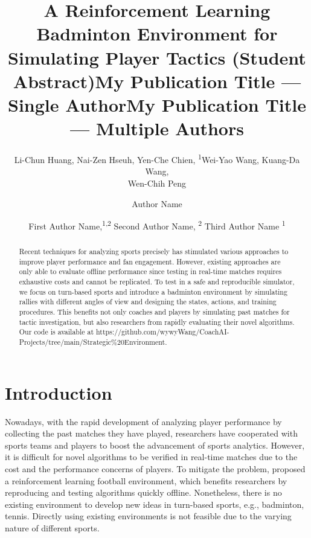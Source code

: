 \documentclass[letterpaper]{article}
\title{A Reinforcement Learning Badminton Environment for Simulating Player Tactics (Student Abstract)}
\author {
    Li-Chun Huang,
    Nai-Zen Hseuh,
    Yen-Che Chien,
    \textsuperscript{\rm 1}Wei-Yao Wang,
    Kuang-Da Wang, \\
    Wen-Chih Peng
}
\title{My Publication Title --- Single Author}
\author {
    Author Name
}
\title{My Publication Title --- Multiple Authors}
\author {
    First Author Name,\textsuperscript{\rm 1,\rm 2}
    Second Author Name, \textsuperscript{\rm 2}
    Third Author Name \textsuperscript{\rm 1}
}
\begin{document}
\maketitle

\begin{abstract}
Recent techniques for analyzing sports precisely has stimulated various approaches to improve player performance and fan engagement.
However, existing approaches are only able to evaluate offline performance since testing in real-time matches requires exhaustive costs and cannot be replicated.
To test in a safe and reproducible simulator, we focus on turn-based sports and introduce a badminton environment by simulating rallies with different angles of view and designing the states, actions, and training procedures.
This benefits not only coaches and players by simulating past matches for tactic investigation, but also researchers from rapidly evaluating their novel algorithms.
Our code is available at https://github.com/wywyWang/CoachAI-Projects/tree/main/Strategic\%20Environment.
\end{abstract}

\section{Introduction}
Nowadays, with the rapid development of analyzing player performance by collecting the past matches they have played, researchers have cooperated with sports teams and players to boost the advancement of sports analytics.
However, it is difficult for novel algorithms to be verified in real-time matches due to the cost and the performance concerns of players.
To mitigate the problem, \citet{DBLP:conf/aaai/KurachRSZBERVMB20} proposed a reinforcement learning football environment, which benefits researchers by reproducing and testing algorithms quickly offline.
Nonetheless, there is no existing environment to develop new ideas in turn-based sports, e.g., badminton, tennis.
Directly using existing environments is not feasible due to the varying nature of different sports.
\end{document}
